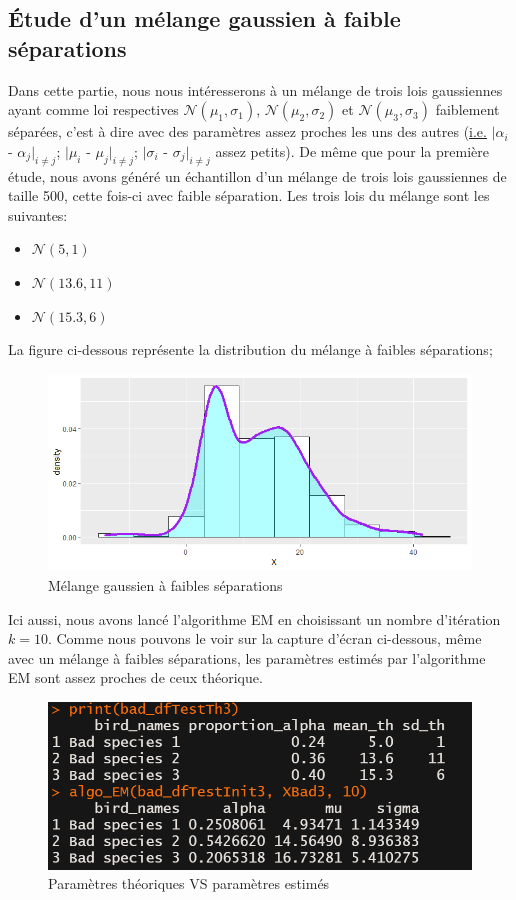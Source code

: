 \documentclass[frenchb]{report}
\newcommand{\1}{\mathbbm{1}}
\theoremstyle{definition}\newtheorem{defn}{Définition}
\theoremstyle{definition}\newtheorem{exm}{Exemple}
\theoremstyle{definition}\newtheorem{nota}{Notation}
\theoremstyle{definition}\newtheorem{rem}{Remarque}
\begin{document}
\subsection{Étude d'un mélange gaussien à faible séparations}
Dans cette partie, nous nous intéresserons à un mélange de trois lois gaussiennes ayant comme loi respectives $\mathcal{N}(\mu_1, \sigma_1)$, $\mathcal{N}(\mu_2, \sigma_2)$ et $\mathcal{N}(\mu_3, \sigma_3)$ faiblement séparées, c'est à dire avec des paramètres assez proches les uns des autres (\underline{i.e.} $|\alpha_i$ - $\alpha_j|_{i \neq j}$; $|\mu_i$ - $\mu_j|_{i \neq j}$; $|\sigma_i$ - $\sigma_j|_{i \neq j}$ assez petits).
De même que pour la première étude, nous avons généré un échantillon d'un mélange de trois lois gaussiennes de taille 500, cette fois-ci avec faible séparation. Les trois lois du mélange sont les suivantes:
\begin{itemize}
	\item $\mathcal{N}(5, 1)$
	\item $\mathcal{N}(13.6, 11)$
	\item $\mathcal{N}(15.3, 6)$
\end{itemize}
La figure ci-dessous représente la distribution du mélange à faibles séparations;

\begin{figure}[H]
	\centering
	\includegraphics[scale=0.7]{images/bad_distrib.png}
	\caption{Mélange gaussien à faibles séparations}
\end{figure}
Ici aussi, nous avons lancé l'algorithme EM en choisissant un nombre d'itération $k = 10$. Comme nous pouvons le voir sur la capture d'écran ci-dessous, même avec un mélange à faibles séparations, les paramètres estimés par l'algorithme EM sont assez proches de ceux théorique.
\begin{figure}[H]%
	\centering
	\includegraphics[scale=0.7]{images/EM_bad.png}
	\caption{Paramètres théoriques VS paramètres estimés}
\end{figure}
\end{document}
